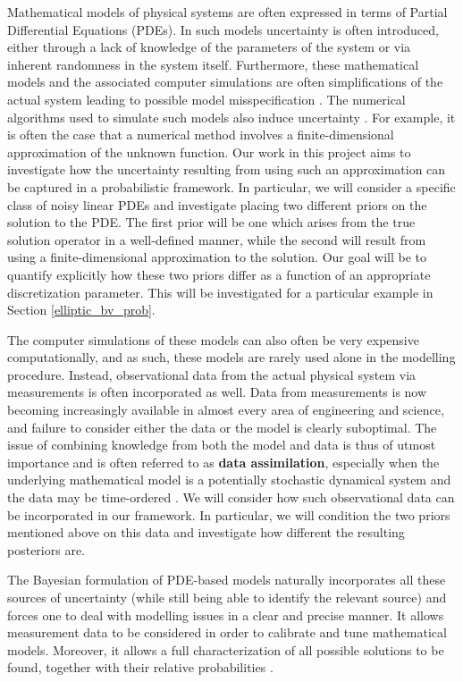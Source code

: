 
Mathematical models of physical systems are often expressed in terms of Partial Differential Equations (PDEs). In such models uncertainty is often introduced, either through a lack of knowledge of the parameters of the system or via inherent randomness in the system itself. Furthermore, these mathematical models and the associated computer simulations are often simplifications of the actual system leading to possible model misspecification \textcolor{blue}{\citep{girolami2019statistical}}. The numerical algorithms used to simulate such models also induce uncertainty \textcolor{blue}{\citep{conrad2017statistical}}. For example, it is often the case that a numerical method involves a finite-dimensional approximation of the unknown function. Our work in this project aims to investigate how the uncertainty resulting from using such an approximation can be captured in a probabilistic framework. In particular, we will consider a specific class of noisy linear PDEs and investigate placing two different priors on the solution to the PDE. The first prior will be one which arises from the true solution operator in a well-defined manner, while the second will result from using a finite-dimensional approximation to the solution. Our goal will be to quantify explicitly how these two priors differ as a function of an appropriate discretization parameter. This will be investigated for a particular example in Section \textcolor{blue}{\ref{elliptic_bv_prob}}.

The computer simulations of these models can also often be very expensive computationally, and as such, these models are rarely used alone in the modelling procedure. Instead, observational data from the actual physical system via measurements is often incorporated as well. Data from measurements is now becoming increasingly available in almost every area of engineering and science, and failure to consider either the data or the model is clearly suboptimal. The issue of combining knowledge from both the model and data is thus of utmost importance and is often referred to as \textbf{data assimilation}, especially when the underlying mathematical model is a potentially stochastic dynamical system and the data may be time-ordered \textcolor{blue}{\citep{law2015data}}. We will consider how such observational data can be incorporated in our framework. In particular, we will condition the two priors mentioned above on this data and investigate how different the resulting posteriors are.

The Bayesian formulation of PDE-based models naturally incorporates all these sources of uncertainty (while still being able to identify the relevant source) and forces one to deal with modelling issues in a clear and precise manner. It allows measurement data to be considered in order to calibrate and tune mathematical models. Moreover, it allows a full characterization of all possible solutions to be found, together with their relative probabilities \textcolor{blue}{\citep{stuart2010inverse}}.

